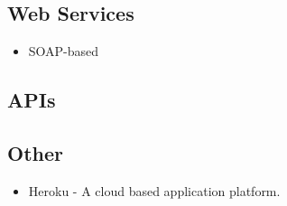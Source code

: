 \subsection{Web Services}
\begin{itemize}
	\item SOAP-based
\end{itemize} 

\subsection{APIs}
\subsection{Other}
\begin{itemize}
	\item Heroku - A cloud based application platform.
\end{itemize}





